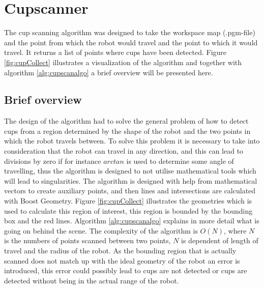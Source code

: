 \chapter{Cupscanner}\label{chap:cupscanner}

The cup scanning algorithm was designed to take the workspace map (.pgm-file) and the point from which the robot would travel and the point to which it would travel. It returns a list of points where cups have been detected. Figure \ref{fig:cupCollect} illustrates a visualization of the algorithm and together with algorithm \ref{alg:cupscanalgo} a brief overview will be presented here.

\section{Brief overview}
The design of the algorithm had to solve the general problem of how to detect cups from a region determined by the shape of the robot and the two points in which the robot travels between. To solve this problem it is necessary to take into consideration that the robot can travel in any direction, and this can lead to divisions by zero if for instance $arctan$ is used to determine some angle of travelling, thus the algorithm is designed to not utilise mathematical tools which will lead to singularities. The algorithm is designed with help from mathematical vectors to create auxiliary points, and then lines and intersections are calculated with Boost Geometry. Figure \ref{fig:cupCollect} illustrates the geometries which is used to calculate this region of interest, this region is bounded by the bounding box and the red lines. Algorithm \ref{alg:cupscanalgo} explains in more detail what is going on behind the scene. The complexity of the algorithm is $O(N)$, where $N$ is the numbers of points scanned between two points, $N$ is dependent of length of travel and the radius of the robot. As the bounding region that is actually scanned does not match up with the ideal geometry of the robot an error is introduced, this error could possibly lead to cups are not detected or cups are detected without being in the actual range of the robot.

